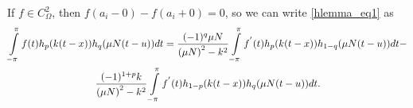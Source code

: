 
\begin{corollary} \label{cor_hlemma}
	If $f \in C_\Omega^2$, then $f(a_i - 0) - f(a_i + 0) = 0$, so we can write \eqref{hlemma_eq1} as
	\begin{multline*}
	\intop_{-\pi}^{\pi}f(t)h_{p}(k(t-x))h_{q}(\mu N(t-u))dt= 
	\frac{(-1)^{q}\mu N}{\left(\mu N\right)^{2}-k^{2}}\intop_{-\pi}^{\pi}f^{'}(t)h_{p}(k(t-x))h_{1-q}(\mu N(t-u))dt-\\
	\frac{(-1)^{1+p}k}{\left(\mu N\right)^{2}-k^{2}}\intop_{-\pi}^{\pi}f^{'}(t)h_{1-p}(k(t-x))h_{q}(\mu N(t-u))dt.
	\end{multline*}
\end{corollary}

